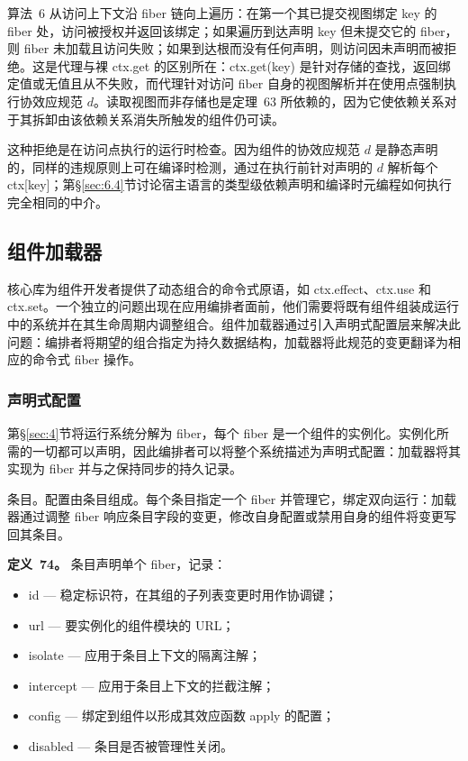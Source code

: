 算法~6 从访问上下文沿 fiber 链向上遍历：在第一个其已提交视图绑定 key 的 fiber 处，访问被授权并返回该绑定；如果遍历到达声明 key 但未提交它的 fiber，则 fiber 未加载且访问失败；如果到达根而没有任何声明，则访问因未声明而被拒绝。这是代理与裸 ctx.get 的区别所在：ctx.get(key) 是针对存储的查找，返回绑定值或无值且从不失败，而代理针对访问 fiber 自身的视图解析并在使用点强制执行协效应规范 $d$。读取视图而非存储也是定理~63 所依赖的，因为它使依赖关系对于其拆卸由该依赖关系消失所触发的组件仍可读。

这种拒绝是在访问点执行的运行时检查。因为组件的协效应规范 $d$ 是静态声明的，同样的违规原则上可在编译时检测，通过在执行前针对声明的 $d$ 解析每个 ctx[key]；第\S\ref{sec:6.4}节讨论宿主语言的类型级依赖声明和编译时元编程如何执行完全相同的中介。

\subsection{组件加载器}\label{sec:5.2}

核心库为组件开发者提供了动态组合的命令式原语，如 ctx.effect、ctx.use 和 ctx.set。一个独立的问题出现在应用编排者面前，他们需要将既有组件组装成运行中的系统并在其生命周期内调整组合。组件加载器通过引入声明式配置层来解决此问题：编排者将期望的组合指定为持久数据结构，加载器将此规范的变更翻译为相应的命令式 fiber 操作。

\subsubsection{声明式配置}\label{sec:5.2.1}

第\S\ref{sec:4}节将运行系统分解为 fiber，每个 fiber 是一个组件的实例化。实例化所需的一切都可以声明，因此编排者可以将整个系统描述为声明式配置：加载器将其实现为 fiber 并与之保持同步的持久记录。

条目。配置由条目组成。每个条目指定一个 fiber 并管理它，绑定双向运行：加载器通过调整 fiber 响应条目字段的变更，修改自身配置或禁用自身的组件将变更写回其条目。

\textbf{定义~74。} 条目声明单个 fiber，记录：
\begin{itemize}
\item id — 稳定标识符，在其组的子列表变更时用作协调键；
\item url — 要实例化的组件模块的 URL；
\item isolate — 应用于条目上下文的隔离注解；
\item intercept — 应用于条目上下文的拦截注解；
\item config — 绑定到组件以形成其效应函数 apply 的配置；
\item disabled — 条目是否被管理性关闭。
\end{itemize}

